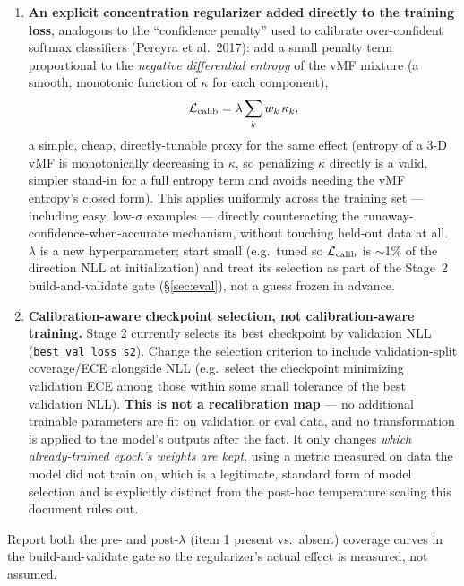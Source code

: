 \documentclass[11pt]{article}
\newcommand{\code}[1]{\texttt{#1}}
\begin{document}
\begin{enumerate}[leftmargin=*]
\item \textbf{An explicit concentration regularizer added directly to the training loss},
      analogous to the ``confidence penalty'' used to calibrate over-confident softmax
      classifiers (Pereyra et al.\ 2017): add a small penalty term proportional to the
      \emph{negative differential entropy} of the vMF mixture (a smooth, monotonic function
      of $\kappa$ for each component), \[ \mathcal{L}_{\rm calib} = \lambda \sum_k w_k\,
      \kappa_k, \] a simple, cheap, directly-tunable proxy for the same effect (entropy of a
      3-D vMF is monotonically decreasing in $\kappa$, so penalizing $\kappa$ directly is a
      valid, simpler stand-in for a full entropy term and avoids needing the vMF entropy's
      closed form). This applies uniformly across the training set — including easy,
      low-$\sigma$ examples — directly counteracting the runaway-confidence-when-accurate
      mechanism, without touching held-out data at all. $\lambda$ is a new hyperparameter;
      start small (e.g.\ tuned so $\mathcal{L}_{\rm calib}$ is $\sim$1\% of the direction NLL
      at initialization) and treat its selection as part of the Stage~2 build-and-validate
      gate (\S\ref{sec:eval}), not a guess frozen in advance.
\item \textbf{Calibration-aware checkpoint selection, not calibration-aware training.} Stage
      2 currently selects its best checkpoint by validation NLL (\code{best\_val\_loss\_s2}).
      Change the selection criterion to include validation-split coverage/ECE alongside NLL
      (e.g.\ select the checkpoint minimizing validation ECE among those within some small
      tolerance of the best validation NLL). \textbf{This is not a recalibration map} --- no
      additional trainable parameters are fit on validation or eval data, and no
      transformation is applied to the model's outputs after the fact. It only changes
      \emph{which already-trained epoch's weights are kept}, using a metric measured on data
      the model did not train on, which is a legitimate, standard form of model selection
      and is explicitly distinct from the post-hoc temperature scaling this document rules
      out.
\end{enumerate}

Report both the pre- and post-$\lambda$ (item 1 present vs.\ absent) coverage curves in the
build-and-validate gate so the regularizer's actual effect is measured, not assumed.
\end{document}
